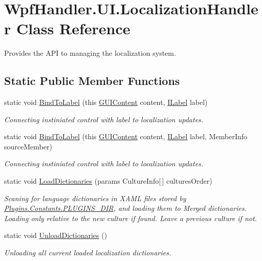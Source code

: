 \hypertarget{class_wpf_handler_1_1_u_i_1_1_localization_handler}{}\section{Wpf\+Handler.\+U\+I.\+Localization\+Handler Class Reference}
\label{class_wpf_handler_1_1_u_i_1_1_localization_handler}


Provides the A\+PI to managing the localization system.  


\subsection*{Static Public Member Functions}
\begin{DoxyCompactItemize}
\item 
static void \mbox{\hyperlink{class_wpf_handler_1_1_u_i_1_1_localization_handler_a619201b52fa3480e4bdb75231ebdd666}{Bind\+To\+Label}} (this \mbox{\hyperlink{class_wpf_handler_1_1_u_i_1_1_g_u_i_content}{G\+U\+I\+Content}} content, \mbox{\hyperlink{interface_wpf_handler_1_1_u_i_1_1_controls_1_1_i_label}{I\+Label}} label)
\begin{DoxyCompactList}\small\item\em Connecting instiniated control with label to localization updates. \end{DoxyCompactList}\item 
static void \mbox{\hyperlink{class_wpf_handler_1_1_u_i_1_1_localization_handler_a45a3a6581764446bf67a622119d9b89d}{Bind\+To\+Label}} (this \mbox{\hyperlink{class_wpf_handler_1_1_u_i_1_1_g_u_i_content}{G\+U\+I\+Content}} content, \mbox{\hyperlink{interface_wpf_handler_1_1_u_i_1_1_controls_1_1_i_label}{I\+Label}} label, Member\+Info source\+Member)
\begin{DoxyCompactList}\small\item\em Connecting instiniated control with label to localization updates. \end{DoxyCompactList}\item 
static void \mbox{\hyperlink{class_wpf_handler_1_1_u_i_1_1_localization_handler_a8159e214fd8c0709f32b5b1b3cf25020}{Load\+Dictionaries}} (params Culture\+Info\mbox{[}$\,$\mbox{]} cultures\+Order)
\begin{DoxyCompactList}\small\item\em Scaning for language dictionaries in X\+A\+ML files stored by \mbox{\hyperlink{class_wpf_handler_1_1_plugins_1_1_constants_a96f55ef86fe92a534722f4788340f390}{Plugins.\+Constants.\+P\+L\+U\+G\+I\+N\+S\+\_\+\+D\+IR}}, and loading them to Merged dictionaries. Loading only relative to the new culture if found. Leave a previous culture if not. \end{DoxyCompactList}\item 
static void \mbox{\hyperlink{class_wpf_handler_1_1_u_i_1_1_localization_handler_a5703a690547759b592d63b5f5b2f489e}{Unload\+Dictionaries}} ()
\begin{DoxyCompactList}\small\item\em Unloading all current loaded localization dictionaries. \end{DoxyCompactList}\end{DoxyCompactItemize}
